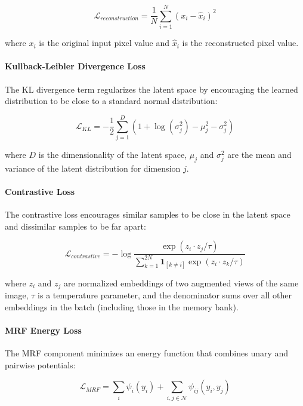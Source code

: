 \documentclass[conference]{IEEEtran}
\begin{document}
\begin{equation}
\mathcal{L}_{reconstruction} = \frac{1}{N} \sum_{i=1}^{N} (x_i - \hat{x}_i)^2
\end{equation}

where $x_i$ is the original input pixel value and $\hat{x}_i$ is the reconstructed pixel value.

\paragraph{Kullback-Leibler Divergence Loss}
The KL divergence term regularizes the latent space by encouraging the learned distribution to be close to a standard normal distribution:

\begin{equation}
\mathcal{L}_{KL} = -\frac{1}{2} \sum_{j=1}^{D} \left(1 + \log(\sigma_j^2) - \mu_j^2 - \sigma_j^2\right)
\end{equation}

where $D$ is the dimensionality of the latent space, $\mu_j$ and $\sigma_j^2$ are the mean and variance of the latent distribution for dimension $j$.

\paragraph{Contrastive Loss}
The contrastive loss encourages similar samples to be close in the latent space and dissimilar samples to be far apart:

\begin{equation}
\mathcal{L}_{contrastive} = -\log \frac{\exp(z_i \cdot z_j / \tau)}{\sum_{k=1}^{2N} \mathbf{1}_{[k \neq i]} \exp(z_i \cdot z_k / \tau)}
\end{equation}

where $z_i$ and $z_j$ are normalized embeddings of two augmented views of the same image, $\tau$ is a temperature parameter, and the denominator sums over all other embeddings in the batch (including those in the memory bank).

\paragraph{MRF Energy Loss}
The MRF component minimizes an energy function that combines unary and pairwise potentials:

\begin{equation}
\mathcal{L}_{MRF} = \sum_{i} \psi_i(y_i) + \sum_{i,j \in \mathcal{N}} \psi_{ij}(y_i, y_j)
\end{equation}
\end{document}
